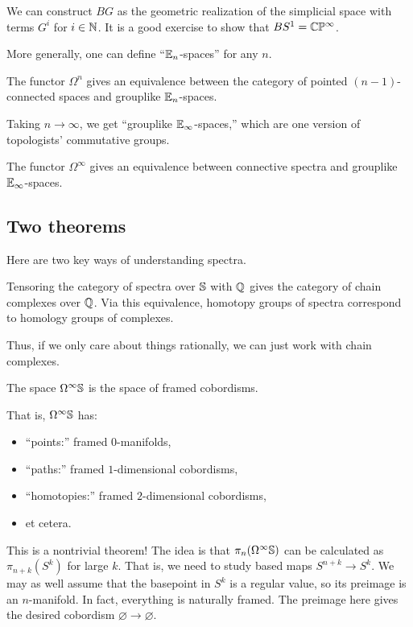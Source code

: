\documentclass{article}
\begin{document}
We can construct $BG$ as the geometric realization of the simplicial space with terms $G^i$ for $i \in \mathbb{N}$.
It is a good exercise to show that $BS^1 = \mathbb{C}\mathbb{P}^\infty$.

More generally, one can define ``$\mathbb{E}_n$-spaces'' for any $n$.

\begin{thm}
  The functor $\Omega^n$ gives an equivalence between the category of pointed $(n-1)$-connected spaces and grouplike $\mathbb{E}_n$-spaces.
\end{thm}

Taking $n \to \infty$, we get ``grouplike $\mathbb{E}_\infty$-spaces,'' which are one version of topologists' commutative groups.

\begin{thm}
  The functor $\Omega^\infty$ gives an equivalence between connective spectra and grouplike $\mathbb{E}_\infty$-spaces.
\end{thm}

\subsection{Two theorems}

Here are two key ways of understanding spectra.

\begin{thm}
  Tensoring the category of spectra over $\mathbb{S}$ with $\mathbb{Q}$ gives the category of chain complexes over $\mathbb{Q}$.
  Via this equivalence, homotopy groups of spectra correspond to homology groups of complexes.
\end{thm}

Thus, if we only care about things rationally, we can just work with chain complexes.

\begin{thm}
  The space $\Omega^\infty \mathbb{S}$ is the space of framed cobordisms.
\end{thm}

That is, $\Omega^\infty \mathbb{S}$ has:
\begin{itemize}
  \item ``points:'' framed $0$-manifolds,
  \item ``paths:'' framed $1$-dimensional cobordisms,
  \item ``homotopies:'' framed $2$-dimensional cobordisms,
  \item et cetera.
\end{itemize}

This is a nontrivial theorem!
The idea is that $\pi_n(\Omega^\infty \mathbb{S})$ can be calculated as $\pi_{n+k}(S^k)$ for large $k$.
That is, we need to study based maps $S^{n+k} \to S^k$.
We may as well assume that the basepoint in $S^k$ is a regular value, so its preimage is an $n$-manifold.
In fact, everything is naturally framed.
The preimage here gives the desired cobordism $\varnothing \to \varnothing$.
\end{document}

